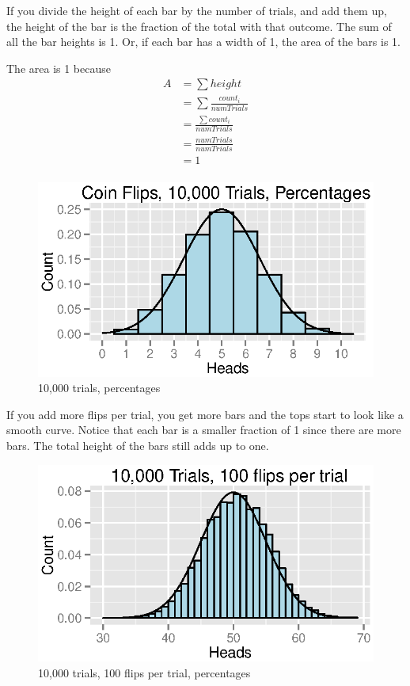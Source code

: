 \documentclass{exam}
\begin{document}
  If you divide the height of each bar by the number of trials, and add them up, the
  height of the bar is the fraction of the total with that outcome.  The sum of all the
  bar heights is 1.  Or, if each bar has a width of 1, the area of the bars is 1.

  The area is 1 because
  \begin{align*}
    A & = \sum height \\
      & = \sum \frac{count_i}{numTrials} \\
      & = \frac{\sum count_i}{numTrials} \\
      & = \frac{numTrials}{numTrials} \\
      & = 1 \\
  \end{align*}

  \begin{figure}[H]
    \centering
    \includegraphics{figures/coins/10000_10_percent.eps}
    \caption{10,000 trials, percentages}
  \end{figure}

  If you add more flips per trial, you get more bars and the tops start to look like a
  smooth curve.  Notice that each bar is a smaller fraction of 1 since there are more
  bars.  The total height of the bars still adds up to one.

  \begin{figure}[H]
    \centering
    \includegraphics{figures/coins/10000_100.eps}
    \caption{10,000 trials, 100 flips per trial, percentages}
  \end{figure}
\end{document}

